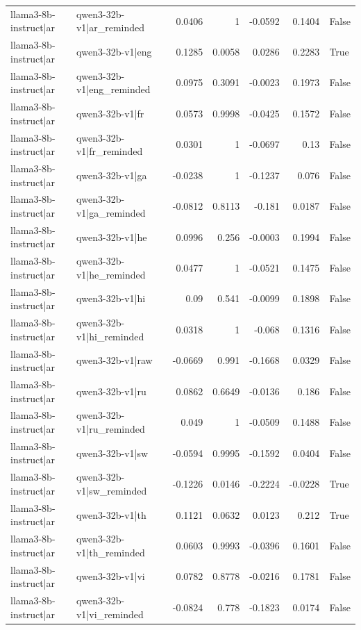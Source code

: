 \begin{table}
\begin{tabular}{l l r r r r l}
llama3-8b-instruct|ar & qwen3-32b-v1|ar_reminded & 0.0406 & 1 & -0.0592 & 0.1404 & False \\
llama3-8b-instruct|ar & qwen3-32b-v1|eng & 0.1285 & 0.0058 & 0.0286 & 0.2283 & True \\
llama3-8b-instruct|ar & qwen3-32b-v1|eng_reminded & 0.0975 & 0.3091 & -0.0023 & 0.1973 & False \\
llama3-8b-instruct|ar & qwen3-32b-v1|fr & 0.0573 & 0.9998 & -0.0425 & 0.1572 & False \\
llama3-8b-instruct|ar & qwen3-32b-v1|fr_reminded & 0.0301 & 1 & -0.0697 & 0.13 & False \\
llama3-8b-instruct|ar & qwen3-32b-v1|ga & -0.0238 & 1 & -0.1237 & 0.076 & False \\
llama3-8b-instruct|ar & qwen3-32b-v1|ga_reminded & -0.0812 & 0.8113 & -0.181 & 0.0187 & False \\
llama3-8b-instruct|ar & qwen3-32b-v1|he & 0.0996 & 0.256 & -0.0003 & 0.1994 & False \\
llama3-8b-instruct|ar & qwen3-32b-v1|he_reminded & 0.0477 & 1 & -0.0521 & 0.1475 & False \\
llama3-8b-instruct|ar & qwen3-32b-v1|hi & 0.09 & 0.541 & -0.0099 & 0.1898 & False \\
llama3-8b-instruct|ar & qwen3-32b-v1|hi_reminded & 0.0318 & 1 & -0.068 & 0.1316 & False \\
llama3-8b-instruct|ar & qwen3-32b-v1|raw & -0.0669 & 0.991 & -0.1668 & 0.0329 & False \\
llama3-8b-instruct|ar & qwen3-32b-v1|ru & 0.0862 & 0.6649 & -0.0136 & 0.186 & False \\
llama3-8b-instruct|ar & qwen3-32b-v1|ru_reminded & 0.049 & 1 & -0.0509 & 0.1488 & False \\
llama3-8b-instruct|ar & qwen3-32b-v1|sw & -0.0594 & 0.9995 & -0.1592 & 0.0404 & False \\
llama3-8b-instruct|ar & qwen3-32b-v1|sw_reminded & -0.1226 & 0.0146 & -0.2224 & -0.0228 & True \\
llama3-8b-instruct|ar & qwen3-32b-v1|th & 0.1121 & 0.0632 & 0.0123 & 0.212 & True \\
llama3-8b-instruct|ar & qwen3-32b-v1|th_reminded & 0.0603 & 0.9993 & -0.0396 & 0.1601 & False \\
llama3-8b-instruct|ar & qwen3-32b-v1|vi & 0.0782 & 0.8778 & -0.0216 & 0.1781 & False \\
llama3-8b-instruct|ar & qwen3-32b-v1|vi_reminded & -0.0824 & 0.778 & -0.1823 & 0.0174 & False \\

\end{tabular}
\end{table}
